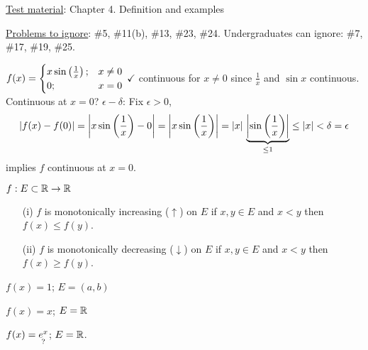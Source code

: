\documentclass[]{article}
\begin{document}
\ul{Test material}: Chapter 4.
Definition and examples

\ul{Problems to ignore}:
\#5, \#11(b), \#13, \#23, \#24.
Undergraduates can ignore:
\#7, \#17, \#19, \#25.

\begin{example}
$f(x) = \begin{cases} x\sin\plr{\frac1x}; & x\neq 0 \\ 0; & x=0 \end{cases}$ 
	$\checkmark$ continuous for $x\neq0$ since $\frac1x$ and $\sin x$ continuous.
	Continuous at $x=0$?
	\ul{\ul{$\epsilon-\delta$}}: Fix $\epsilon>0$,
	\begin{align*}
		|f(x) - f(0)| = \mlr{x\sin\plr{\frac1x}-0} = \mlr{x\sin\plr{\frac1x}} = |x|\,\ub{\leq1}{\mlr{\sin\plr{\frac1x}}} \leq |x| < \delta = \epsilon
	\end{align*}
	implies $f$ continuous at $x=0$.
\end{example}

\begin{definition}
	 $f:E\subset\mb R\ra\mb R$
\begin{enumerate}
	\item[(i)] $f$ is monotonically increasing ($\uparrow$) on $E$ if $x,y\in E$ and $x<y$ then $f(x) \leq f(y)$.
	\item[(ii)] $f$ is monotonically decreasing ($\downarrow$) on $E$ if $x,y\in E$ and $x<y$ then $f(x) \geq f(y)$.
\end{enumerate}
\end{definition}
\begin{example}
	$f(x) = 1$; $E = (a,b)$
\end{example}
\begin{example}
	$f(x) = x$; $E=\mb R$
\end{example}
\begin{example}
	$f(x) = \us{?}{e^x}$; $E=\mb R$.
\end{example}
\end{document}
